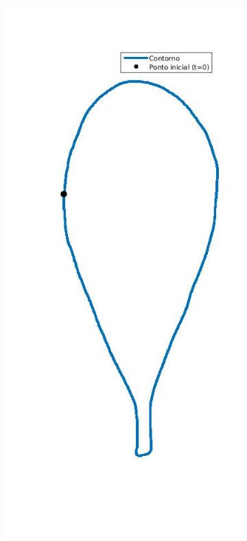 \begin{figure}[htb]
	\centering
	\caption{Curvatura calculada para o contorno.}
	\begin{subfigure}[b]{0.22\textwidth}
		\centering
		\includegraphics[trim={2cm 1cm 0 0},clip,width=1\textwidth]{img/contorno.jpg}

\end{subfigure}
\end{figure}
